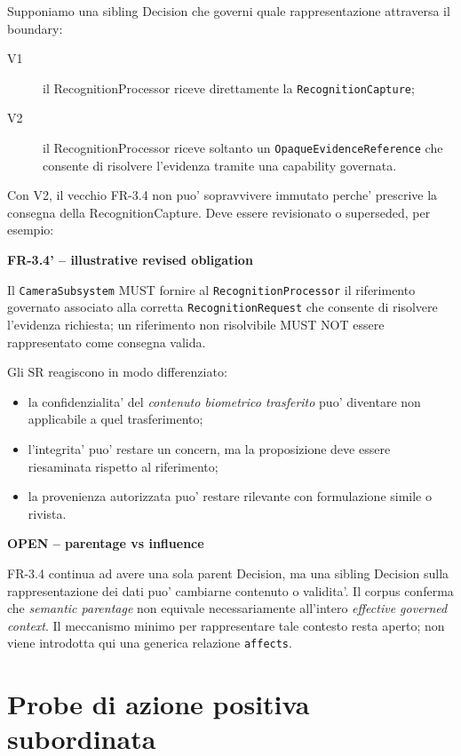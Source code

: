 \documentclass[11pt,a4paper]{article}
\newcommand{\openstatus}{\textbf{OPEN}}
\newenvironment{statusbox}[1]{%
  \def\FrameCommand{\fcolorbox{ddtablue}{ddtagray}}%
  \MakeFramed{\advance\hsize-2\width\FrameRestore}
  \noindent\textbf{#1}\par\smallskip
}{\endMakeFramed}
\begin{document}
Supponiamo una sibling Decision che governi quale rappresentazione attraversa il boundary:

\begin{description}
  \item[V1] il RecognitionProcessor riceve direttamente la \texttt{RecognitionCapture};
  \item[V2] il RecognitionProcessor riceve soltanto un \texttt{OpaqueEvidenceReference} che consente di risolvere l'evidenza tramite una capability governata.
\end{description}

Con V2, il vecchio FR-3.4 non puo' sopravvivere immutato perche' prescrive la consegna della RecognitionCapture. Deve essere revisionato o superseded, per esempio:

\begin{statusbox}{FR-3.4' -- illustrative revised obligation}
Il \texttt{CameraSubsystem} MUST fornire al \texttt{RecognitionProcessor} il riferimento governato associato alla corretta \texttt{RecognitionRequest} che consente di risolvere l'evidenza richiesta; un riferimento non risolvibile MUST NOT essere rappresentato come consegna valida.
\end{statusbox}

Gli SR reagiscono in modo differenziato:

\begin{itemize}
  \item la confidenzialita' del \emph{contenuto biometrico trasferito} puo' diventare non applicabile a quel trasferimento;
  \item l'integrita' puo' restare un concern, ma la proposizione deve essere riesaminata rispetto al riferimento;
  \item la provenienza autorizzata puo' restare rilevante con formulazione simile o rivista.
\end{itemize}

\begin{statusbox}{\openstatus{} -- parentage vs influence}
FR-3.4 continua ad avere una sola parent Decision, ma una sibling Decision sulla rappresentazione dei dati puo' cambiarne contenuto o validita'. Il corpus conferma che \emph{semantic parentage} non equivale necessariamente all'intero \emph{effective governed context}. Il meccanismo minimo per rappresentare tale contesto resta aperto; non viene introdotta qui una generica relazione \texttt{affects}.
\end{statusbox}

\section{Probe di azione positiva subordinata}
\end{document}
